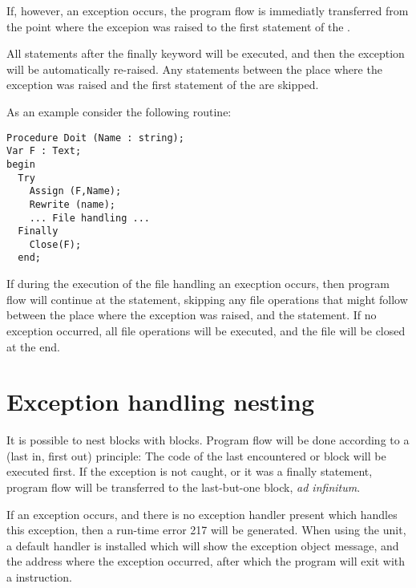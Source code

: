 If, however, an exception occurs, the program flow is immediatly
transferred from the point where the excepion was raised to the first
statement of the .

All statements after the finally keyword will be executed, and then
the exception will be automatically re-raised. Any statements between the
place where the exception was raised and the first statement of the
 are skipped.

As an example consider the following routine:
\begin{verbatim}
Procedure Doit (Name : string);
Var F : Text;
begin
  Try
    Assign (F,Name);
    Rewrite (name);
    ... File handling ...
  Finally
    Close(F);
  end;
\end{verbatim}
If during the execution of the file handling an execption occurs, then
program flow will continue at the  statement, skipping any
file operations that might follow between the place where the exception
was raised, and the  statement.
If no exception occurred, all file operations will be executed, and the file
will be closed at the end.


\section{Exception handling nesting}
It is possible to nest  blocks with 
blocks. Program flow will be done according to a  (last in, first
out) principle: The code of the last encountered  or
  block will be executed first. If the exception is not
caught, or it was a finally statement, program flow will be transferred to
the last-but-one block, {\em ad infinitum}.

If an exception occurs, and there is no exception handler present which
handles this exception, then a run-time error 217 will be generated. 
When using the  unit, a default handler is installed which will show the exception object message, and the
address where the exception occurred, after which the program will exit with
a  instruction.


